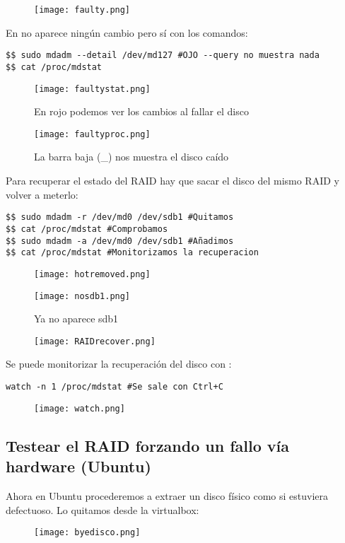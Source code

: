 \begin{figure}[H]
	\centering
	\texttt{[image: faulty.png]}
\end{figure}

En  no aparece ningún cambio pero sí con los comandos:

\begin{verbatim}
$$ sudo mdadm --detail /dev/md127 #OJO --query no muestra nada
$$ cat /proc/mdstat
\end{verbatim}
\begin{figure}[H]
	\centering
	\texttt{[image: faultystat.png]}
	\caption{En rojo podemos ver los cambios al fallar el disco}
\end{figure}
\begin{figure}[H]
	\centering
	\texttt{[image: faultyproc.png]}
	\caption{La barra baja (\_) nos muestra el disco caído}
\end{figure}

Para recuperar el estado del RAID hay que sacar el disco del mismo RAID y volver a meterlo:
\begin{verbatim}
$$ sudo mdadm -r /dev/md0 /dev/sdb1 #Quitamos
$$ cat /proc/mdstat #Comprobamos
$$ sudo mdadm -a /dev/md0 /dev/sdb1 #Añadimos
$$ cat /proc/mdstat #Monitorizamos la recuperacion
\end{verbatim}
\begin{figure}[H]
	\centering
	\texttt{[image: hotremoved.png]}
\end{figure}
\begin{figure}[H]
	\centering
	\texttt{[image: nosdb1.png]}
	\caption{Ya no aparece sdb1}
\end{figure}
\begin{figure}[H]
	\centering
	\texttt{[image: RAIDrecover.png]}
\end{figure}

Se puede monitorizar la recuperación del disco con :
\begin{verbatim}
watch -n 1 /proc/mdstat #Se sale con Ctrl+C
\end{verbatim}
\begin{figure}[H]
	\centering
	\texttt{[image: watch.png]}
\end{figure}

\subsection{Testear el RAID forzando un fallo vía hardware (Ubuntu)}
Ahora en Ubuntu procederemos a extraer un disco físico como si estuviera defectuoso. Lo quitamos desde la virtualbox:
\begin{figure}[H]
	\centering
	\texttt{[image: byedisco.png]}
\end{figure}

